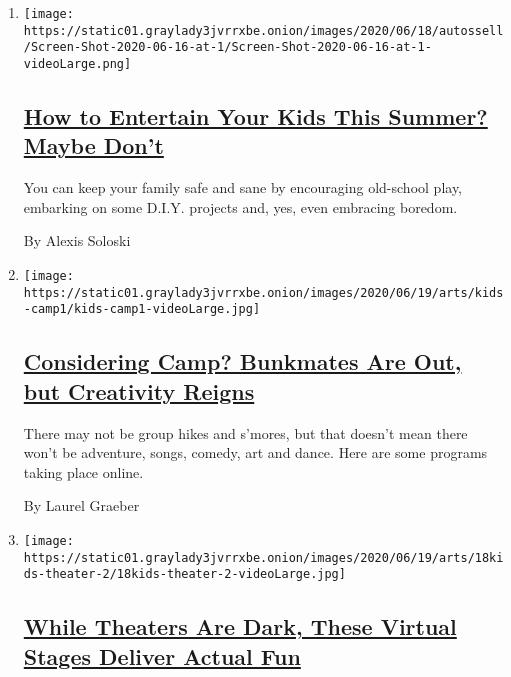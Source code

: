 \begin{enumerate}
\def\labelenumi{\arabic{enumi}.}
\item
  \texttt{[image: https://static01.graylady3jvrrxbe.onion/images/2020/06/18/autossell/Screen-Shot-2020-06-16-at-1/Screen-Shot-2020-06-16-at-1-videoLarge.png]}

  \hypertarget{how-to-entertain-your-kids-this-summer-maybe-dont}{%
  \subsection{\texorpdfstring{\href{/2020/06/18/arts/kids-summer-activities-virus.html}{How
  to Entertain Your Kids This Summer? Maybe
  Don't}}{How to Entertain Your Kids This Summer? Maybe Don't}}\label{how-to-entertain-your-kids-this-summer-maybe-dont}}

  You can keep your family safe and sane by encouraging old-school play,
  embarking on some D.I.Y. projects and, yes, even embracing boredom.

  By Alexis Soloski
\item
  \texttt{[image: https://static01.graylady3jvrrxbe.onion/images/2020/06/19/arts/kids-camp1/kids-camp1-videoLarge.jpg]}

  \hypertarget{considering-camp-bunkmates-are-out-but-creativity-reigns}{%
  \subsection{\texorpdfstring{\href{/2020/06/18/arts/kids-summer-camps-virtual.html}{Considering
  Camp? Bunkmates Are Out, but Creativity
  Reigns}}{Considering Camp? Bunkmates Are Out, but Creativity Reigns}}\label{considering-camp-bunkmates-are-out-but-creativity-reigns}}

  There may not be group hikes and s'mores, but that doesn't mean there
  won't be adventure, songs, comedy, art and dance. Here are some
  programs taking place online.

  By Laurel Graeber
\item
  \texttt{[image: https://static01.graylady3jvrrxbe.onion/images/2020/06/19/arts/18kids-theater-2/18kids-theater-2-videoLarge.jpg]}

  \hypertarget{while-theaters-are-dark-these-virtual-stages-deliver-actual-fun}{%
  \subsection{\texorpdfstring{\href{/2020/06/18/theater/kids-summer-theater-virtual.html}{While
  Theaters Are Dark, These Virtual Stages Deliver Actual
  Fun}}{While Theaters Are Dark, These Virtual Stages Deliver Actual Fun}}\label{while-theaters-are-dark-these-virtual-stages-deliver-actual-fun}}


\end{enumerate}
